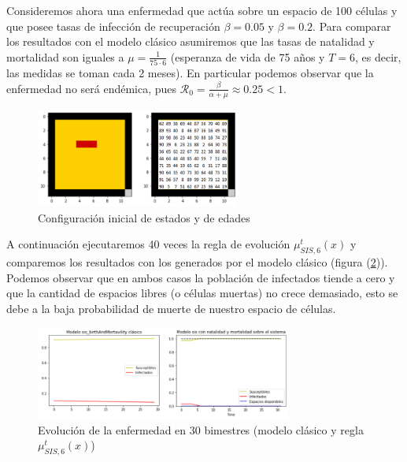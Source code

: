 \begin{example}\label{ex:sisClásicovsModeloEnAC}
Consideremos ahora una enfermedad que actúa sobre un espacio de 100 células y que posee tasas de infección de recuperación $\beta=0.05$ y $\beta=0.2$. Para comparar los resultados con el modelo clásico asumiremos que las tasas de natalidad y mortalidad son iguales a $\mu=\frac{1}{75\cdot6}$ (esperanza de vida de 75 años y $T=6$, es decir, las medidas se toman cada 2 meses). En particular podemos observar que la enfermedad no será endémica, pues $\mathcal{R}_0=\frac{\beta}{\alpha+\mu}\approx0.25<1$.

\begin{figure}[h]
  \centering
    \includegraphics[width=0.6\textwidth]{Imagenes/sistemaYEdades.PNG}
    \caption{Configuración inicial de estados y de edades}
    \label{ex:aplicaciónReglaNatalidadyMortalidad}
\end{figure}

A continuación ejecutaremos 40 veces la regla de evolución $\mu_{SIS,6}^t(x)$ y comparemos los resultados con los generados por el modelo clásico (figura (\ref{ex:aplicaciónReglaNatalidadyMortalidad})). Podemos observar que en ambos casos la población de infectados tiende a cero y que la cantidad de espacios libres (o células muertas) no crece demasiado, esto se debe a la baja probabilidad de muerte de nuestro espacio de células.

\begin{figure}[h]
  \centering
    \includegraphics[width=0.75\textwidth]{Imagenes/solucionesNatalidadYMortalidad.PNG}
    \caption{Evolución de la enfermedad en 30 bimestres (modelo clásico y regla $\mu_{SIS,6}^t(x)$)}
    \label{ex:aplicaciónReglaNatalidadyMortalidad}
\end{figure}
\end{example}


